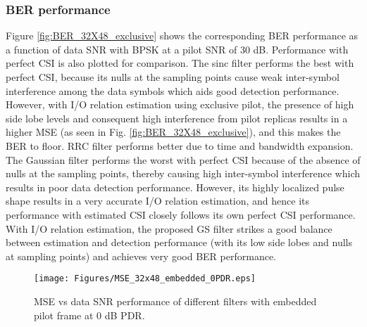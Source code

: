 \subsubsection{BER performance}
Figure \ref{fig:BER_32X48_exclusive} shows the corresponding BER performance as a function of data SNR with BPSK at a pilot SNR of 30 dB. 
Performance with perfect CSI is also plotted for comparison. The sinc filter performs the best with perfect CSI, because its nulls at the sampling points cause weak inter-symbol interference among the data symbols which aids good detection performance. However, with I/O relation estimation using exclusive pilot, the presence of high side lobe levels and consequent high interference from pilot replicas results in a higher MSE (as seen in Fig. \ref{fig:BER_32X48_exclusive}), and this makes the BER to floor. RRC filter performs 
better due to time and bandwidth expansion. The Gaussian filter performs the worst with perfect CSI because of the absence of nulls at the sampling points, thereby causing high inter-symbol interference which results in poor data detection performance. However, its highly localized pulse shape results in a very accurate I/O relation estimation, and hence its performance with estimated CSI closely follows its own perfect CSI performance.
With I/O relation estimation, the proposed GS filter strikes a good balance between estimation and detection performance (with its low side lobes and nulls at sampling points) and achieves very good BER performance. 

\begin{figure}[!t]
\centering
\texttt{[image: Figures/MSE\_32x48\_embedded\_0PDR.eps]}
\caption{MSE vs data SNR performance of different filters with embedded pilot frame at 0 dB PDR.}
\label{fig_mse}
\vspace{-4mm}
\end{figure}

\vspace{3mm}
